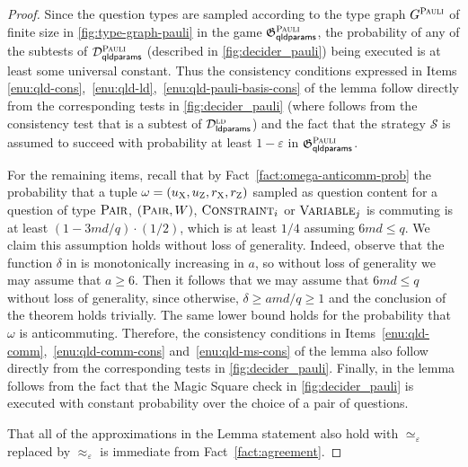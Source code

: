 \documentclass[11pt]{article}
\theoremstyle{definition}
\newcommand{\ld}{\textsc{ld}}
\newcommand{\eps}{\varepsilon}
\newcommand{\game}{\mathfrak{G}}
\newcommand{\decider}{\mathcal{D}}
\newcommand{\strategy}{\mathscr{S}}
\newcommand{\gamestyle}[1]{\ensuremath{\textsc{#1}}\xspace}
\newcommand{\pauli}{\gamestyle{Pauli}}
\newcommand{\labelstyle}[1]{\ensuremath{\textsc{#1}}\xspace}
\newcommand{\xpt}{\labelstyle{X}}
\newcommand{\zpt}{\labelstyle{Z}}
\newcommand{\typestyle}[1]{\ensuremath{\textsc{#1}}\xspace}
\newcommand{\Pair}{\typestyle{Pair}}
\newcommand{\Constraint}{\typestyle{Constraint}}
\newcommand{\Variable}{\typestyle{Variable}}
\newcommand{\Pauli}{\typestyle{Pauli}}
\newcommand{\qldparams}{\mathsf{qldparams}}
\newcommand{\ldparams}{\mathsf{ldparams}}
\begin{document}
\begin{proof}
	Since the question types are sampled according to the type graph $G^\Pauli$ of
  finite size in \cref{fig:type-graph-pauli} in the game
  $\game^\pauli_\qldparams$, the probability of any of the subtests of
  $\decider^\pauli_\qldparams$ (described in \cref{fig:decider_pauli})
  being executed is at least some universal constant.
  Thus the consistency conditions expressed in Items
  \ref{enu:qld-cons},~\ref{enu:qld-ld},~\ref{enu:qld-pauli-basis-cons} of the
  lemma follow directly from the corresponding tests in
  \cref{fig:decider_pauli} (where  follows from the
  consistency test that is a subtest of $\decider^\ld_\ldparams$) and the fact
  that the strategy $\strategy$ is assumed to succeed with probability at least
  $1 - \eps$ in $\game^\pauli_\qldparams$.
				
  For the remaining items, recall that by Fact~\ref{fact:omega-anticomm-prob}
  the probability that a tuple $\omega=(u_\xpt,u_\zpt,r_\xpt,r_\zpt)$ sampled as
  question content for a question of type $\Pair$, $(\Pair,W)$, $\Constraint_i$
  or $\Variable_j$ is commuting is at least $(1 - 3md/q) \cdot (1/2)$, which is
  at least $1/4$ assuming $6md \leq q$. We claim this assumption holds
  without loss of generality. Indeed, observe that the function
  $\delta$ in  is monotonically increasing in $a$, so without loss of generality we may assume that $a
  \geq 6$.  Then it follows that we may assume that $6md \leq q$
  without loss of generality, since otherwise, $\delta \geq a md /q
  \geq 1$ and the conclusion of the theorem holds trivially.
  The same lower bound holds for the probability that $\omega$ is anticommuting.
  Therefore, the consistency conditions in
  Items~\ref{enu:qld-comm},~\ref{enu:qld-comm-cons} and~\ref{enu:qld-ms-cons} of
  the lemma also follow directly from the corresponding tests in
  \cref{fig:decider_pauli}.
  Finally,  in the lemma follows from the fact that the Magic
  Square check in \cref{fig:decider_pauli} is executed with constant probability
  over the choice of a pair of questions.
				
That all of the approximations in the Lemma statement also hold with
$\simeq_\eps$ replaced by $\approx_\eps$ is immediate from Fact~\ref{fact:agreement}.
\end{proof}
\end{document}
